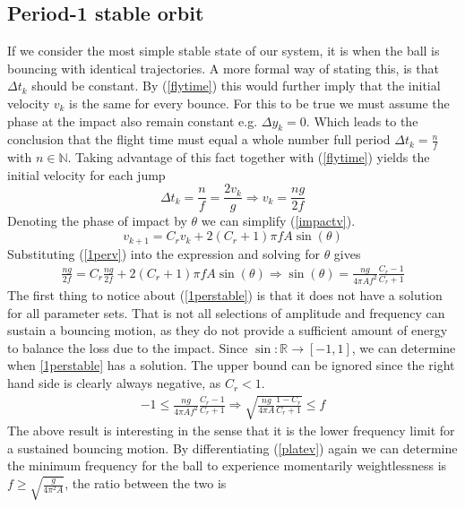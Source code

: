 \documentclass[12pt,oneside,a4paper]{article}
\numberwithin{equation}{section}
\begin{document}
{{{{\subsection{Period-1 stable orbit}
If we consider the most simple stable state of our system, it is when the ball is bouncing with identical trajectories. A more formal way of stating this, is that $\Delta t_k$ should be constant. By  (\ref{flytime}) this would further imply that the initial velocity $v_k$ is the same for every bounce. For this to be true we must assume the phase at the impact also remain constant e.g. $\Delta y_k=0$. Which leads to the conclusion that the flight time must equal a whole number full period $\Delta t_k = \frac{n}{f}$ with $n\in \mathbb{N}$. Taking advantage of this fact together with (\ref{flytime}) yields the initial velocity for each jump
\begin{equation}
	\Delta t_k = \frac{n}{f} = \frac{2v_k}{g} \Rightarrow v_k = \frac{ng}{2f}
	\label{1perv}
\end{equation}
Denoting the phase of impact by $\theta$ we can simplify (\ref{impactv}).
\begin{equation}
	v_{k+1} = C_rv_k+2(C_r+1)\pi fA \sin(\theta)
\end{equation}
Substituting (\ref{1perv}) into the expression and solving for $\theta$ gives
\begin{align}
	\frac{ng}{2f} = C_r\frac{ng}{2f}+2(C_r+1)\pi fA \sin(\theta) \Rightarrow \sin(\theta) = \frac{ng}{4\pi Af^2 }\frac{C_r-1}{C_r+1}
	\label{1perstable}
\end{align}
The first thing to notice about (\ref{1perstable}) is that it does not have a solution for all parameter sets. That is not all selections of amplitude and frequency can sustain a bouncing motion, as they do not provide a sufficient amount of energy to balance the loss due to the impact. Since $\sin: \mathbb{R} \rightarrow [-1,1]$, we can determine when \eqref{1perstable} has a solution. The upper bound can be  ignored since the right hand side is clearly always negative, as $C_r<1$.
\begin{align}
	-1 \le \frac{ng}{4\pi Af^2 }\frac{C_r-1}{C_r+1} \Rightarrow \sqrt{\frac{ng}{4\pi A}\frac{1-C_r}{C_r+1}} \le f
\end{align}
The above result is interesting in the sense that it is the lower frequency limit for a sustained bouncing motion. By differentiating (\ref{platev}) again we can determine the minimum frequency for the ball to experience momentarily weightlessness is $f\ge\sqrt{\frac{g}{4\pi^2A}}$, the ratio between the two is
}}}}
\end{document}
